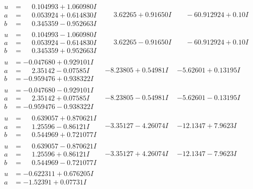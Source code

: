 \documentclass[1p]{elsarticle_modified}
\theoremstyle{definition}
\begin{document}
$$\begin{array}{c|c|c}
\begin{aligned}
u &= \phantom{-}0.104993 + 1.060980 I \\
a &= \phantom{-}0.053924 + 0.614830 I \\
b &= \phantom{-}0.345359 - 0.952663 I\end{aligned}
 & \phantom{-}3.62265 + 0.91650 I & \phantom{-}                -6
0.912924 + 0. 10   I\phantom{ +0.000000I} \\ \hline\begin{aligned}
u &= \phantom{-}0.104993 - 1.060980 I \\
a &= \phantom{-}0.053924 - 0.614830 I \\
b &= \phantom{-}0.345359 + 0.952663 I\end{aligned}
 & \phantom{-}3.62265 - 0.91650 I & \phantom{-}                -6
0.912924 + 0. 10   I\phantom{ +0.000000I} \\ \hline\begin{aligned}
u &= -0.047680 + 0.929101 I \\
a &= \phantom{-}2.35142 - 0.07585 I \\
b &= -0.959476 + 0.938322 I\end{aligned}
 & -8.23805 + 0.54981 I & -5.62601 + 0.13195 I \\ \hline\begin{aligned}
u &= -0.047680 - 0.929101 I \\
a &= \phantom{-}2.35142 + 0.07585 I \\
b &= -0.959476 - 0.938322 I\end{aligned}
 & -8.23805 - 0.54981 I & -5.62601 - 0.13195 I \\ \hline\begin{aligned}
u &= \phantom{-}0.639057 + 0.870621 I \\
a &= \phantom{-}1.25596 - 0.86121 I \\
b &= \phantom{-}0.544969 + 0.721077 I\end{aligned}
 & -3.35127 - 4.26074 I & -12.1347 + 7.9623 I \\ \hline\begin{aligned}
u &= \phantom{-}0.639057 - 0.870621 I \\
a &= \phantom{-}1.25596 + 0.86121 I \\
b &= \phantom{-}0.544969 - 0.721077 I\end{aligned}
 & -3.35127 + 4.26074 I & -12.1347 - 7.9623 I \\ \hline\begin{aligned}
u &= -0.622311 + 0.676205 I \\
a &= -1.52391 + 0.07731 I \\

\end{aligned}
\end{array}$$
\end{document}
